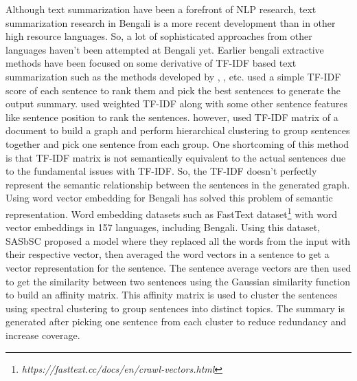 \documentclass[acmlarge]{acmart}
\begin{document}
Although text summarization have been a forefront of NLP research, text summarization research in Bengali is a more recent development than in other high resource languages. So, a lot of sophisticated approaches from other languages haven't been attempted at Bengali yet. Earlier bengali extractive methods have been focused on some derivative of TF-IDF based text summarization such as the methods developed by \citeauthor{chowdhury-etal-2021-tfidf-clustering} \cite{chowdhury-etal-2021-tfidf-clustering}, \citeauthor{das-2022-tfidf} \cite{das-2022-tfidf}, \citeauthor{sarkar-2012-tfidf} \cite{sarkar-2012-tfidf} etc. \citeauthor{sarkar-2012-tfidf} \cite{sarkar-2012-tfidf} used a simple TF-IDF score of each sentence to rank them and pick the best sentences to generate the output summary. \citeauthor{das-2022-tfidf} \cite{das-2022-tfidf} used weighted TF-IDF along with some other sentence features like sentence position to rank the sentences. \citeauthor{chowdhury-etal-2021-tfidf-clustering} \cite{chowdhury-etal-2021-tfidf-clustering} however, used TF-IDF matrix of a document to build a graph and perform hierarchical clustering to group sentences together and pick one sentence from each group. One shortcoming of this method is that TF-IDF matrix is not semantically equivalent to the actual sentences due to the fundamental issues with TF-IDF. So, the TF-IDF doesn't perfectly represent the semantic relationship between the sentences in the generated graph. Using word vector embedding for Bengali has solved this problem of semantic representation. Word embedding datasets such as FastText \cite{grave-etal-2018-fasttext} dataset\footnote{\textit{https://fasttext.cc/docs/en/crawl-vectors.html}} with word vector embeddings in 157 languages, including Bengali. Using this dataset, SASbSC \cite{roychowdhury-etal-2022-spectral-base} proposed a model where they replaced all the words from the input with their respective vector, then averaged the word vectors in a sentence to get a vector representation for the sentence. The sentence average vectors are then used to get the similarity between two sentences using the Gaussian similarity function to build an affinity matrix. This affinity matrix is used to cluster the sentences using spectral clustering to group sentences into distinct topics. The summary is generated after picking one sentence from each cluster to reduce redundancy and increase coverage.
\end{document}
